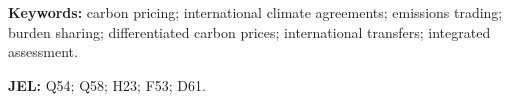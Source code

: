 \documentclass[12pt,english]{article}
\newif\ifblind
\theoremstyle{remark}
\begin{document}
\begin{abstract}
\end{abstract}

\medskip
\noindent\textbf{Keywords:} carbon pricing; international climate agreements; emissions trading; burden sharing; differentiated carbon prices; international transfers; integrated assessment.

\noindent\textbf{JEL:} Q54; Q58; H23; F53; D61.


\clearpage

\ifblind
  \doublespacing
  \linenumbers
\else
  \tableofcontents
\fi

\end{document}
